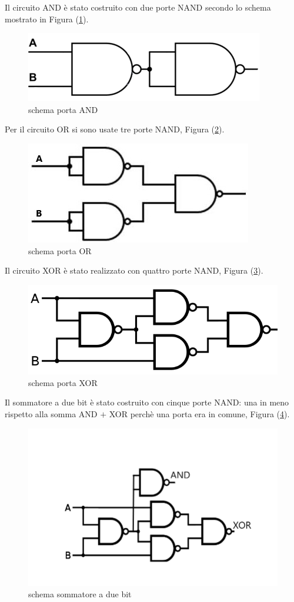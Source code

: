 \documentclass[10pt,a4paper]{article}
\begin{document}
Il circuito AND è stato costruito con due porte NAND secondo lo schema mostrato in Figura (\ref{fig:and}).

\begin{figure}
			\centering
			\includegraphics[scale=0.60]{and}
			\caption{schema porta AND}
			\label{fig:and}
\end{figure}
Per il circuito OR  si sono usate tre porte NAND, Figura (\ref{fig:or}).
\begin{figure}
			\centering
			\includegraphics[scale=0.85]{or}
			\caption{schema porta OR}
			\label{fig:or}
\end{figure}
Il circuito XOR  è stato realizzato con quattro porte NAND, Figura (\ref{fig:xor}).
\begin{figure}
			\centering
			\includegraphics[scale=0.55]{xor}
			\caption{schema porta XOR}
			\label{fig:xor}
\end{figure}
Il sommatore a due bit è stato costruito con cinque porte NAND: una in meno rispetto alla somma AND $+$  XOR perchè una porta era in comune, Figura (\ref{fig:som}).
\begin{figure}
			\centering
			\includegraphics[scale=0.55]{sommatore}
			\caption{schema sommatore a due bit}
			\label{fig:som}
\end{figure}
\end{document}
